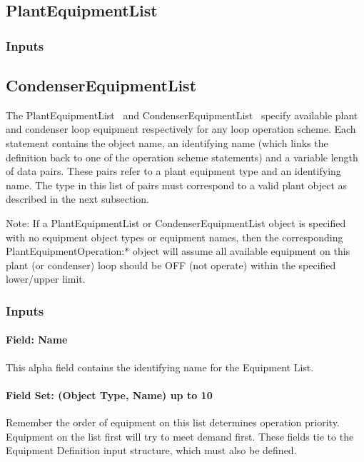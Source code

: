 \subsection{PlantEquipmentList}\label{plantequipmentlist}

\subsubsection{Inputs}\label{inputs-14-009}

\subsection{CondenserEquipmentList}\label{condenserequipmentlist}

The PlantEquipmentList ~and CondenserEquipmentList ~specify available plant and condenser loop equipment respectively for any loop operation scheme. Each statement contains the object name, an identifying name (which links the definition back to one of the operation scheme statements) and a variable length of data pairs. These pairs refer to a plant equipment type and an identifying name. The type in this list of pairs must correspond to a valid plant object as described in the next subsection.

Note: If a PlantEquipmentList or CondenserEquipmentList object is specified with no equipment object types or equipment names, then the corresponding PlantEquipmentOperation:* object will assume all available equipment on this plant (or condenser) loop should be OFF (not operate) within the specified lower/upper limit.

\subsubsection{Inputs}\label{inputs-15-009}

\paragraph{Field: Name}\label{field-name-8-013}

This alpha field contains the identifying name for the Equipment List.

\paragraph{Field Set: (Object Type, Name) up to 10}\label{field-set-object-type-name-up-to-10}

Remember the order of equipment on this list determines operation priority. Equipment on the list first will try to meet demand first. These fields tie to the Equipment Definition input structure, which must also be defined.

